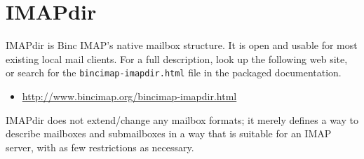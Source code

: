\documentclass[11pt,a4paper,twoside,openright]{report}
\begin{document}
\section{IMAPdir}

IMAPdir is Binc IMAP's native mailbox structure. It is open and usable
for most existing local mail clients. For a full description, look up
the following web site, or search for the
\texttt{bincimap-imapdir.html} file in the packaged documentation.

\begin{itemize}
\item [] \url{http://www.bincimap.org/bincimap-imapdir.html}
\end{itemize}

IMAPdir does not extend/change any mailbox formats; it merely defines
a way to describe mailboxes and submailboxes in a way that is suitable
for an IMAP server, with as few restrictions as necessary.
\end{document}
